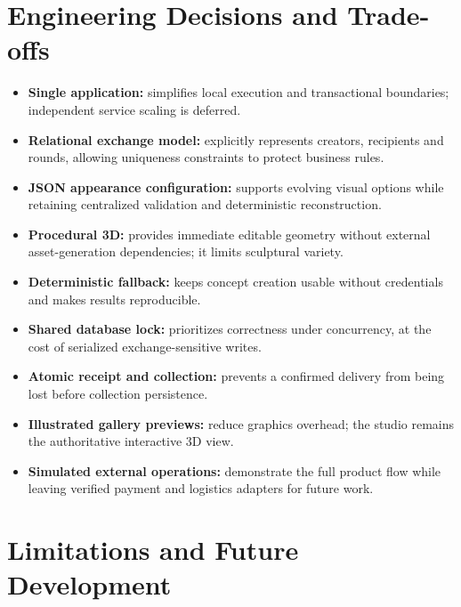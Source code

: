 \documentclass[11pt,a4paper]{article}
\begin{document}
\section{Engineering Decisions and Trade-offs}

\begin{itemize}
  \item \textbf{Single application:} simplifies local execution and transactional boundaries; independent service scaling is deferred.
  \item \textbf{Relational exchange model:} explicitly represents creators, recipients and rounds, allowing uniqueness constraints to protect business rules.
  \item \textbf{JSON appearance configuration:} supports evolving visual options while retaining centralized validation and deterministic reconstruction.
  \item \textbf{Procedural 3D:} provides immediate editable geometry without external asset-generation dependencies; it limits sculptural variety.
  \item \textbf{Deterministic fallback:} keeps concept creation usable without credentials and makes results reproducible.
  \item \textbf{Shared database lock:} prioritizes correctness under concurrency, at the cost of serialized exchange-sensitive writes.
  \item \textbf{Atomic receipt and collection:} prevents a confirmed delivery from being lost before collection persistence.
  \item \textbf{Illustrated gallery previews:} reduce graphics overhead; the studio remains the authoritative interactive 3D view.
  \item \textbf{Simulated external operations:} demonstrate the full product flow while leaving verified payment and logistics adapters for future work.
\end{itemize}

\section{Limitations and Future Development}
\end{document}

